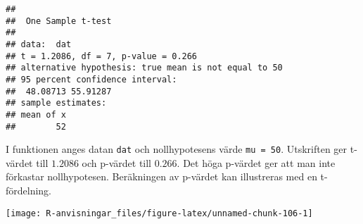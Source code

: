 \documentclass[
]{book}
\newenvironment{Shaded}{\begin{snugshade}}{\end{snugshade}}
\newcommand{\AttributeTok}[1]{\textcolor[rgb]{0.77,0.63,0.00}{#1}}
\newcommand{\DecValTok}[1]{\textcolor[rgb]{0.00,0.00,0.81}{#1}}
\newcommand{\FloatTok}[1]{\textcolor[rgb]{0.00,0.00,0.81}{#1}}
\newcommand{\FunctionTok}[1]{\textcolor[rgb]{0.00,0.00,0.00}{#1}}
\newcommand{\NormalTok}[1]{#1}
\newcommand{\OtherTok}[1]{\textcolor[rgb]{0.56,0.35,0.01}{#1}}
\newcommand{\SpecialCharTok}[1]{\textcolor[rgb]{0.00,0.00,0.00}{#1}}
\newcommand{\StringTok}[1]{\textcolor[rgb]{0.31,0.60,0.02}{#1}}
\theoremstyle{definition}
\theoremstyle{definition}
\theoremstyle{definition}
\theoremstyle{definition}
\theoremstyle{remark}
\begin{document}
\begin{verbatim}
## 
##  One Sample t-test
## 
## data:  dat
## t = 1.2086, df = 7, p-value = 0.266
## alternative hypothesis: true mean is not equal to 50
## 95 percent confidence interval:
##  48.08713 55.91287
## sample estimates:
## mean of x 
##        52
\end{verbatim}

I funktionen anges datan \texttt{dat} och nollhypotesens värde \texttt{mu\ =\ 50}. Utskriften ger t-värdet till \(1.2086\) och p-värdet till \(0.266\). Det höga p-värdet ger att man inte förkastar nollhypotesen. Beräkningen av p-värdet kan illustreras med en t-fördelning.

\begin{Shaded}
\end{Shaded}

\begin{center}\texttt{[image: R-anvisningar\_files/figure-latex/unnamed-chunk-106-1]} \end{center}
\end{document}

